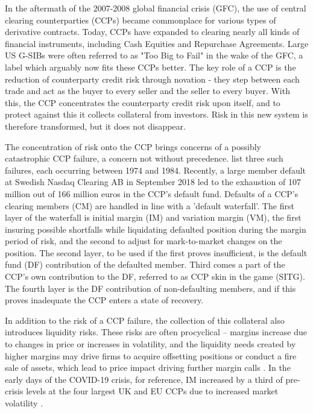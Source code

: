 
In the aftermath of the 2007-2008 global financial crisis (GFC), the use of central clearing counterparties (CCPs) became commonplace for various types of derivative contracts. Today, CCPs have expanded to clearing nearly all kinds of financial instruments, including Cash Equities and Repurchase Agreements. Large US G-SIBs were often referred to as "Too Big to Fail" in the wake of the GFC, a label which arguably now fits these CCPs better. The key role of a CCP is the reduction of counterparty credit risk through novation - they step between each trade and act as the buyer to every seller and the seller to every buyer. With this, the CCP concentrates the counterparty credit risk upon itself, and to protect against this it collects collateral from investors. Risk in this new system is therefore transformed, but it does not disappear. 

The concentration of risk onto the CCP brings concerns of a possibly catastrophic CCP failure, a concern not without precedence. \cite{bignon_vuillemey_2020} list three such failures, each occurring between 1974 and 1984. Recently, a large member default at Swedish Nasdaq Clearing AB in September 2018 led to the exhaustion of 107 million out of 166 million euros in the CCP's default fund. Defaults of a CCP's clearing members (CM) are handled in line with a 'default waterfall'. The first layer of the waterfall is initial margin (IM) and variation margin (VM), the first insuring possible shortfalls while liquidating defaulted position during the margin period of risk, and the second to adjust for mark-to-market changes on the position. The second layer, to be used if the first proves insufficient, is the default fund (DF) contribution of the defaulted member. Third comes a part of the CCP's own contribution to the DF, referred to as CCP skin in the game (SITG). The fourth layer is the DF contribution of non-defaulting members, and if this proves inadequate the CCP enters a state of recovery. 

In addition to the risk of a CCP failure, the collection of this collateral also introduces liquidity risks. These risks are often procyclical -- margins increase due to changes in price or increases in volatility, and the liquidity needs created by higher margins may drive firms to acquire offsetting positions or conduct a fire sale of assets, which lead to price impact driving further margin calls \citep{blanck_2025}. In the early days of the COVID-19 crisis, for reference, IM increased by a third of pre-crisis levels at the four largest UK and EU CCPs due to increased market volatility \citep{esrb_2020_covid}. 

